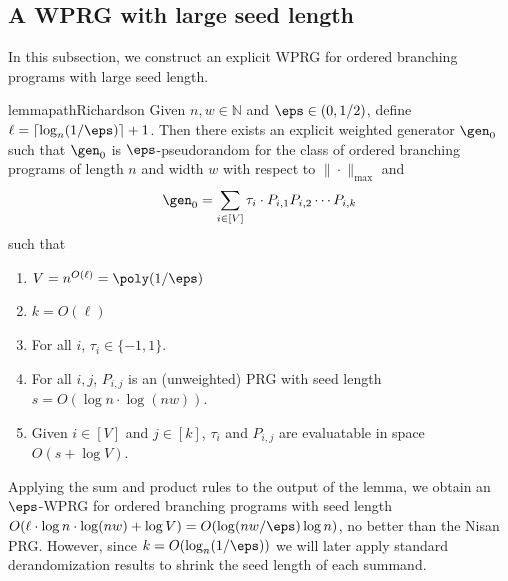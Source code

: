 \documentclass[11pt]{article}
\newcommand{\N}{{\mathbb N}}
\begin{document}
\subsection{A WPRG with large seed length}
In this subsection, we construct an explicit WPRG for ordered branching programs with large seed length.
\begin{restatable}{lemma}{pathRichardson}\label{lem:pathRichardson}
Given $n,w \in \N$ and $\eps \in (0,1/2)$, define $\ell=\lceil \log_{n}(1/\eps)\rceil+1$. Then there exists an explicit weighted generator $\gen_0$ such that $\gen_0$ is $\eps$-pseudorandom for the class of ordered branching programs of length $n$ and width $w$ with respect to $\|\cdot\|_{\max}$ and
\[\gen_0 = \sum_{i\in [V]}\tau_i\cdot P_{i,1}P_{i,2}\cdots P_{i,k}\]
such that %
\begin{enumerate}
    \item $V=n^{O(\ell)}=\poly(1/\eps)$
    \item $k=O(\ell)$
    \item For all $i$, $\tau_i\in \{-1,1\}$.
    \item For all $i,j$, $P_{i,j}$ is an (unweighted) PRG with seed length $s=O(\log n \cdot\log(nw))$.
    \item Given $i\in [V]$ and $j\in [k]$, $\tau_i$ and $P_{i,j}$ are evaluatable in space $O(s+\log V)$.
\end{enumerate}
\end{restatable}
Applying the sum and product rules to the output of the lemma, we obtain an $\eps$-WPRG for ordered branching programs with seed length $O(\ell\cdot \log n\cdot\log(nw)+\log V)=O(\log(nw/\eps)\log n)$, no better than the Nisan PRG. However, since $k=O(\log_{n}(1/\eps))$ we will later apply standard derandomization results to shrink the seed length of each summand.
\end{document}
